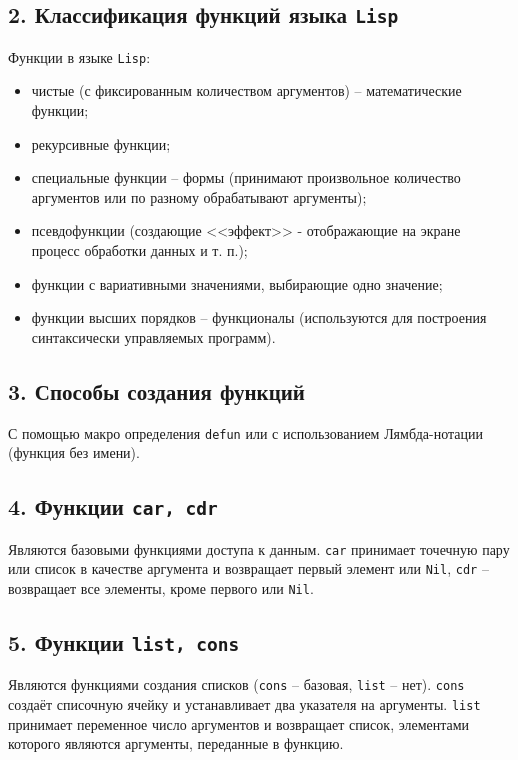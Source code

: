 \subsection*{2. Классификация функций языка {\texttt{Lisp}}}

Функции в языке {\texttt{Lisp}}:
\begin{itemize}
	\item чистые (с фиксированным количеством аргументов) -- математические функции;
	\item рекурсивные функции;
	\item специальные функции -- формы (принимают произвольное количество аргументов или по разному обрабатывают аргументы);
	\item псевдофункции (создающие <<эффект>> - отображающие на экране процесс обработки данных и т. п.);
	\item функции с вариативными значениями, выбирающие одно значение;
	\item функции высших порядков -- функционалы (используются для построения синтаксически управляемых программ).
\end{itemize}

\subsection*{3. Способы создания функций}

С помощью макро определения \texttt{defun} или с использованием Лямбда-нотации (функция без имени).

\subsection*{4. Функции {\texttt{car, cdr}}}

Являются базовыми функциями доступа к данным. {\texttt{car}} принимает точечную пару или список в качестве аргумента и возвращает первый элемент или {\texttt{Nil}}, {\texttt{cdr}} -- возвращает все элементы, кроме первого или {\texttt{Nil}}.

\subsection*{5. Функции {\texttt{list, cons}}}

Являются функциями создания списков ({\texttt{cons}} -- базовая, {\texttt{list}} -- нет). {\texttt{cons}} создаёт списочную ячейку и устанавливает два указателя на аргументы. {\texttt{list}} принимает переменное число аргументов и возвращает список, элементами которого являются аргументы, переданные в функцию.